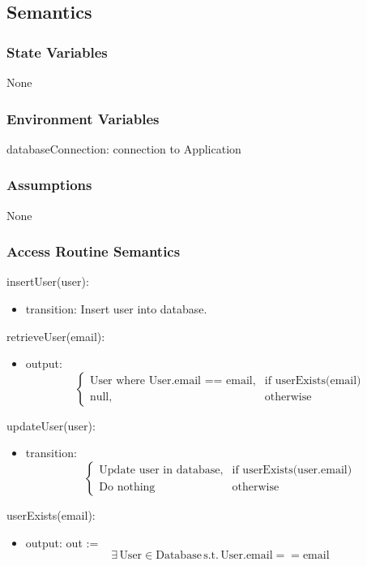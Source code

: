 \documentclass[12pt, titlepage]{article}
\begin{document}
\subsection{Semantics}

\subsubsection{State Variables}
None
\subsubsection{Environment Variables}
databaseConnection: connection to Application

\subsubsection{Assumptions}
None

\subsubsection{Access Routine Semantics}

\noindent insertUser(user):
\begin{itemize}
\item transition: Insert user into database.
\end{itemize}

\noindent retrieveUser(email):
\begin{itemize}
\item output: 
\[
\begin{cases}
    \text{User where User.email == email}, & \text{if } \text{userExists(email)}\\
    \text{null}, & \text{otherwise}
\end{cases}
\]
\end{itemize}

\noindent updateUser(user):
\begin{itemize}
\item transition: 
\[
\begin{cases}
    \text{Update user in database}, & \text{if } \text{userExists(user.email)}\\
    \text{Do nothing} & \text{otherwise}
\end{cases}
\]
\end{itemize}

\noindent userExists(email):
\begin{itemize}
\item output: out := 
\[ \exists \, \text{User} \in \text{Database} \, \text{s.t.} \, \text{User.email} == \text{email}
\]
\end{itemize}
\end{document}
